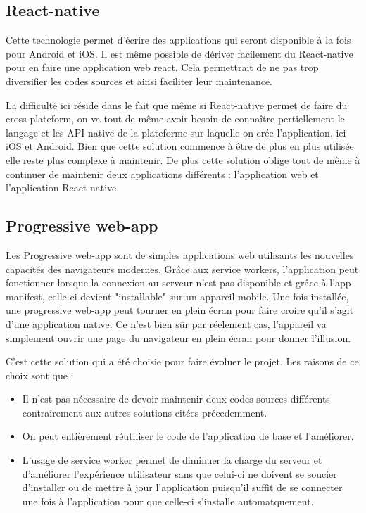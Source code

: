 \documentclass{EPL-master-thesis-covers-FR}
\begin{document}
			\subsection*{React-native}
				Cette technologie permet d'écrire des applications qui seront disponible à la fois pour Android et iOS. Il est même possible de dériver facilement du React-native pour en faire une application web react. Cela permettrait de ne pas trop diversifier les codes sources et ainsi faciliter leur maintenance.
				
				La difficulté ici réside dans le fait que même si React-native permet de faire du cross-plateform, on va tout de même avoir besoin de connaître pertiellement le langage et les API native de la plateforme sur laquelle on crée l'application, ici iOS et Android. Bien que cette solution commence à être de plus en plus utilisée elle reste plus complexe à maintenir. De plus cette solution oblige tout de même à continuer de maintenir deux applications différents : l'application web et l'application React-native.
				
			\subsection*{Progressive web-app}
				Les Progressive web-app sont de simples applications web utilisants les nouvelles capacités des navigateurs modernes. Grâce aux service workers, l'application peut fonctionner lorsque la connexion au serveur n'est pas disponible et grâce à l'app-manifest, celle-ci devient "installable" sur un appareil mobile. Une fois installée, une progressive web-app peut tourner en plein écran pour faire croire qu'il s'agit d'une application native. Ce n'est bien sûr par réelement cas, l'appareil va simplement ouvrir une page du navigateur en plein écran pour donner l'illusion. 
				
				C'est cette solution qui a été choisie pour faire évoluer le projet. Les raisons de ce choix sont que :
				\begin{itemize}
					\item Il n'est pas nécessaire de devoir maintenir deux codes sources différents contrairement aux autres solutions citées précedemment.
					\item On peut entièrement réutiliser le code de l'application de base et l'améliorer.
					\item L'usage de service worker permet de diminuer la charge du serveur et d'améliorer l'expérience utilisateur sans que celui-ci ne doivent se soucier d'installer ou de mettre à jour l'application puisqu'il suffit de se connecter une fois à l'application pour que celle-ci s'installe automatquement.
				\end{itemize}
				
\end{document}
